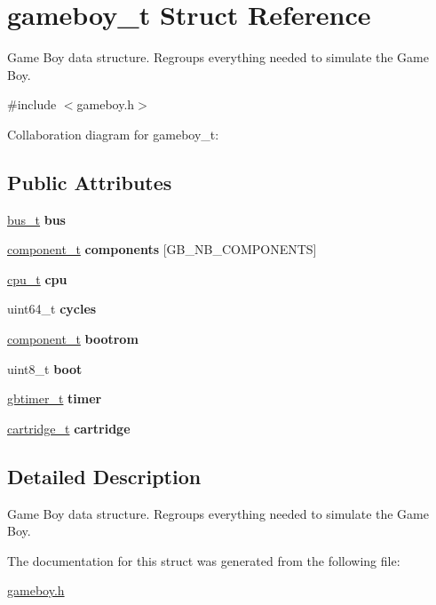 \hypertarget{structgameboy__t}{}\section{gameboy\+\_\+t Struct Reference}
\label{structgameboy__t}


Game Boy data structure. Regroups everything needed to simulate the Game Boy.  




{\ttfamily \#include $<$gameboy.\+h$>$}



Collaboration diagram for gameboy\+\_\+t\+:
\subsection*{Public Attributes}
\begin{DoxyCompactItemize}
\item 
\mbox{\label{structgameboy__t_a99cbbdcbd5a942e7fbc7e96094195b32}} 
\hyperlink{bus_8h_a68c80bdf896e826e4cb082244ce35427}{bus\+\_\+t} {\bfseries bus}
\item 
\mbox{\label{structgameboy__t_a27f2feebb3abf680edf38c797af86cb7}} 
\hyperlink{structcomponent__t}{component\+\_\+t} {\bfseries components} \mbox{[}G\+B\+\_\+\+N\+B\+\_\+\+C\+O\+M\+P\+O\+N\+E\+N\+TS\mbox{]}
\item 
\mbox{\label{structgameboy__t_adedb2b3c1e348d09979c822583499f45}} 
\hyperlink{structcpu__t}{cpu\+\_\+t} {\bfseries cpu}
\item 
\mbox{\label{structgameboy__t_ac55e898226725847fa72ac9ac7f1af15}} 
uint64\+\_\+t {\bfseries cycles}
\item 
\mbox{\label{structgameboy__t_a5500fe620c1b4aa915d4ce2242c21cdb}} 
\hyperlink{structcomponent__t}{component\+\_\+t} {\bfseries bootrom}
\item 
\mbox{\label{structgameboy__t_a82a978f6dde870324d9e80034af2d615}} 
uint8\+\_\+t {\bfseries boot}
\item 
\mbox{\label{structgameboy__t_ab242e2a0713604ffd4fe3c6c60972b93}} 
\hyperlink{structgbtimer__t}{gbtimer\+\_\+t} {\bfseries timer}
\item 
\mbox{\label{structgameboy__t_ad65641e34605468c1fa33f65d15f3798}} 
\hyperlink{structcartridge__t}{cartridge\+\_\+t} {\bfseries cartridge}
\end{DoxyCompactItemize}


\subsection{Detailed Description}
Game Boy data structure. Regroups everything needed to simulate the Game Boy. 

The documentation for this struct was generated from the following file\+:\begin{DoxyCompactItemize}
\item 
\hyperlink{gameboy_8h}{gameboy.\+h}\end{DoxyCompactItemize}
